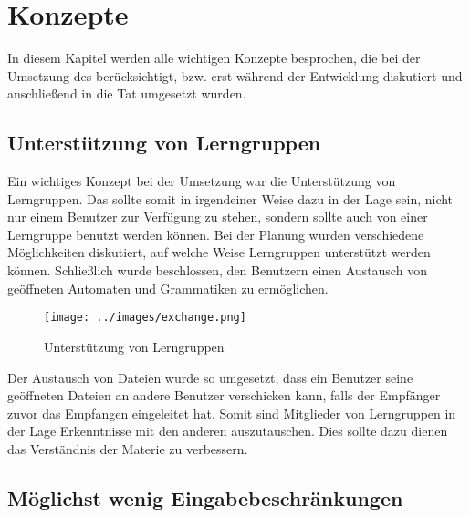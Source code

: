 

\chapter{Konzepte}\label{Concepts}

In diesem Kapitel werden alle wichtigen Konzepte besprochen, die bei der
Umsetzung des \gtitools berücksichtigt, bzw. erst während der Entwicklung
diskutiert und anschließend in die Tat umgesetzt wurden.\vspace{10pt}


\section{Unterstützung von Lerngruppen}\label{ConceptsLerning}

Ein wichtiges Konzept bei der Umsetzung war die Unterstützung von Lerngruppen.
Das \gtitool sollte somit in irgendeiner Weise dazu in der Lage sein, nicht nur
einem Benutzer zur Verfügung zu stehen, sondern sollte auch von einer
Lerngruppe benutzt werden können. Bei der Planung wurden verschiedene
Möglichkeiten diskutiert, auf welche Weise Lerngruppen unterstützt werden
können. Schließlich wurde beschlossen, den Benutzern einen Austausch von
geöffneten Automaten und Grammatiken zu ermöglichen.\vspace{10pt}

\begin{figure}[h!]
\begin{center}
\texttt{[image: ../images/exchange.png]}
\caption{Unterstützung von Lerngruppen}
\end{center}
\end{figure}
\vspace{10pt}

Der Austausch von Dateien wurde so umgesetzt, dass ein Benutzer seine
geöffneten Dateien an andere Benutzer verschicken kann, falls der Empfänger
zuvor das Empfangen eingeleitet hat. Somit sind Mitglieder von Lerngruppen in
der Lage Erkenntnisse mit den anderen auszutauschen. Dies sollte dazu dienen
das Verständnis der Materie zu verbessern.\vspace{10pt}


\section{Möglichst wenig Eingabebeschränkungen}\label{ConceptsInput}

